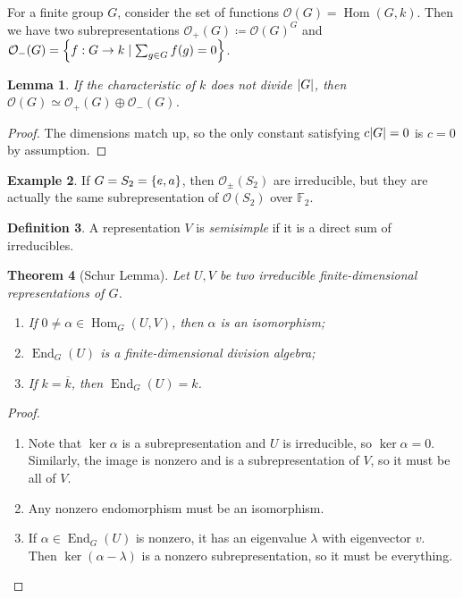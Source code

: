 \documentclass[leqno, openany]{memoir}
\newtheorem{thm}{Theorem}[chapter]
\newtheorem{lem}[thm]{Lemma}
\theoremstyle{definition}
\newtheorem{defn}[thm]{Definition}
\newtheorem{exm}[thm]{Example}
\theoremstyle{remark}
\theoremstyle{plain}
\theoremstyle{definition}
\theoremstyle{remark}
\newcommand{\F}{\mathbb{F}}
\newcommand{\mc}[1]{\mathcal{#1}}
\newcommand{\ol}[1]{\overline{#1}}
\DeclareMathOperator{\Hom}{Hom}
\DeclareMathOperator{\End}{End}
\begin{document}
For a finite group $G$, consider the set of functions $\mc{O}(G) = \Hom(G,k)$. Then we have two subrepresentations $\mc{O}_+(G) \coloneqq \mc{O}(G)^G$ and $\mc{O}_-(G) = \qty{f: G \to k \mid \sum_{g \in G} f(g) = 0}$.

\begin{lem}
    If the characteristic of $k$ does not divide $\abs{G}$, then $\mc{O}(G) \simeq \mc{O}_+(G) \oplus \mc{O}_-(G)$.
\end{lem}

\begin{proof}
    The dimensions match up, so the only constant satisfying $c\abs{G} = 0$ is $c = 0$ by assumption.
\end{proof}

\begin{exm}
    If $G = S_2 = \qty{e,a}$, then $\mc{O}_{\pm}(S_2)$ are irreducible, but they are actually the same subrepresentation of $\mc{O}(S_2)$ over $\F_2$.
\end{exm}

\begin{defn}
    A representation $V$ is \textit{semisimple} if it is a direct sum of irreducibles.
\end{defn}

\begin{thm}[Schur Lemma]
    Let $U,V$ be two irreducible finite-dimensional representations of $G$.
    \begin{enumerate}
        \item If $0 \neq \alpha \in \Hom_G(U,V)$, then $\alpha$ is an isomorphism;
        \item $\End_G(U)$ is a finite-dimensional division algebra;
        \item If $k = \ol{k}$, then $\End_G(U) = k$.
    \end{enumerate}
\end{thm}

\begin{proof} \hfill
    \begin{enumerate}
        \item Note that $\ker \alpha$ is a subrepresentation and $U$ is irreducible, so $\ker \alpha = 0$. Similarly, the image is nonzero and is a subrepresentation of $V$, so it must be all of $V$.
        \item Any nonzero endomorphism must be an isomorphism.
        \item If $\alpha \in \End_G(U)$ is nonzero, it has an eigenvalue $\lambda$ with eigenvector $v$. Then $\ker(\alpha - \lambda)$ is a nonzero subrepresentation, so it must be everything.
    \end{enumerate}
\end{proof}
\end{document}
